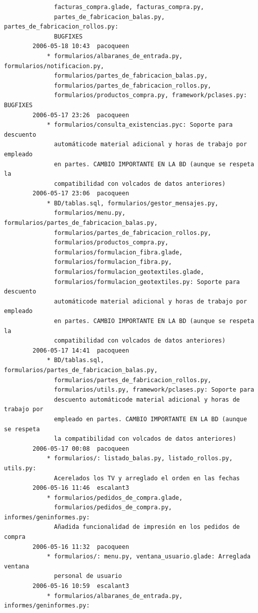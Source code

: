 \documentclass[a4paper]{article}
\begin{document}
\begin{verbatim}
              facturas_compra.glade, facturas_compra.py,
              partes_de_fabricacion_balas.py, partes_de_fabricacion_rollos.py:
              BUGFIXES
        2006-05-18 10:43  pacoqueen
            * formularios/albaranes_de_entrada.py, formularios/notificacion.py,
              formularios/partes_de_fabricacion_balas.py,
              formularios/partes_de_fabricacion_rollos.py,
              formularios/productos_compra.py, framework/pclases.py: BUGFIXES
        2006-05-17 23:26  pacoqueen
            * formularios/consulta_existencias.pyc: Soporte para descuento
              automáticode material adicional y horas de trabajo por empleado
              en partes. CAMBIO IMPORTANTE EN LA BD (aunque se respeta la
              compatibilidad con volcados de datos anteriores)
        2006-05-17 23:06  pacoqueen
            * BD/tablas.sql, formularios/gestor_mensajes.py,
              formularios/menu.py, formularios/partes_de_fabricacion_balas.py,
              formularios/partes_de_fabricacion_rollos.py,
              formularios/productos_compra.py,
              formularios/formulacion_fibra.glade,
              formularios/formulacion_fibra.py,
              formularios/formulacion_geotextiles.glade,
              formularios/formulacion_geotextiles.py: Soporte para descuento
              automáticode material adicional y horas de trabajo por empleado
              en partes. CAMBIO IMPORTANTE EN LA BD (aunque se respeta la
              compatibilidad con volcados de datos anteriores)
        2006-05-17 14:41  pacoqueen
            * BD/tablas.sql, formularios/partes_de_fabricacion_balas.py,
              formularios/partes_de_fabricacion_rollos.py,
              formularios/utils.py, framework/pclases.py: Soporte para
              descuento automáticode material adicional y horas de trabajo por
              empleado en partes. CAMBIO IMPORTANTE EN LA BD (aunque se respeta
              la compatibilidad con volcados de datos anteriores)
        2006-05-17 00:08  pacoqueen
            * formularios/: listado_balas.py, listado_rollos.py, utils.py:
              Acerelados los TV y arreglado el orden en las fechas
        2006-05-16 11:46  escalant3
            * formularios/pedidos_de_compra.glade,
              formularios/pedidos_de_compra.py, informes/geninformes.py:
              Añadida funcionalidad de impresión en los pedidos de compra
        2006-05-16 11:32  pacoqueen
            * formularios/: menu.py, ventana_usuario.glade: Arreglada ventana
              personal de usuario
        2006-05-16 10:59  escalant3
            * formularios/albaranes_de_entrada.py, informes/geninformes.py:

\end{verbatim}
\end{document}
